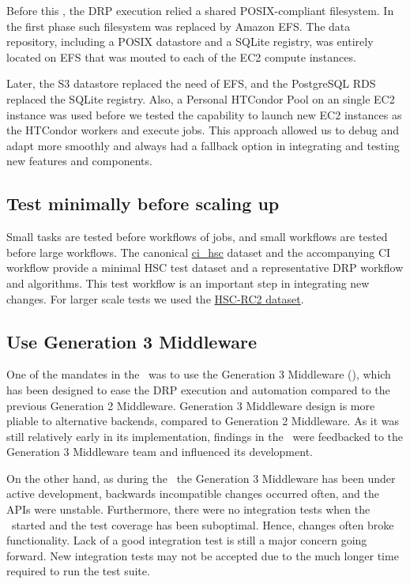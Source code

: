Before this \poc, the DRP execution relied a shared POSIX-compliant filesystem.
In the first phase such filesystem was replaced by Amazon EFS.
The data repository, including a POSIX datastore and a SQLite registry, was entirely located on EFS that was mouted to each of the EC2 compute instances.

Later, the S3 datastore replaced the need of EFS, and the PostgreSQL RDS replaced the SQLite registry.
Also, a Personal HTCondor Pool on an single EC2 instance was used before we tested the capability to launch new EC2 instances as the HTCondor workers and execute jobs.
This approach allowed us to debug and adapt more smoothly and always had a fallback option in integrating and testing new features and components.

\subsection{Test minimally before scaling up}

Small tasks are tested before workflows of jobs, and small workflows are tested before large workflows.
The canonical \href{https://github.com/lsst/ci\_hsc}{ci\_hsc} dataset and the accompanying CI workflow provide a minimal HSC test dataset and a representative DRP workflow and algorithms.
This test workflow is an important step in integrating new changes.
For larger scale tests we used the \href{https://jira.lsstcorp.org/browse/DM-11345}{HSC-RC2 dataset}.

\subsection{Use Generation 3 Middleware}

One of the mandates in the \poc~was to use the Generation 3 Middleware (), which has been designed to ease the DRP execution and automation compared to the previous Generation 2 Middleware. Generation 3 Middleware design is more pliable to alternative backends, compared to Generation 2 Middleware.
As it was still relatively early in its implementation, findings in the \poc~were feedbacked to the Generation 3 Middleware team and influenced its development.

On the other hand, as during the \poc~the Generation 3 Middleware has been under active development, backwards incompatible changes occurred often, and the APIs were unstable.
Furthermore, there were no integration tests when the \poc~started and the test coverage has been suboptimal.
Hence, changes often broke functionality.
Lack of a good integration test is still a major concern going forward.
New integration tests may not be accepted due to the much longer time required to run the test suite.

